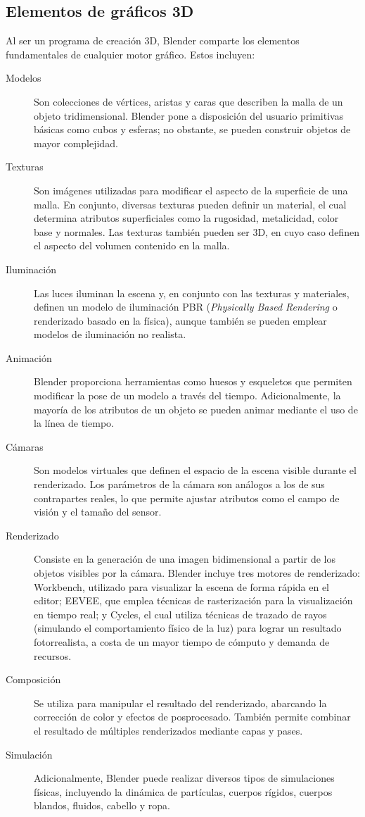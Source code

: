 \subsection{Elementos de gráficos 3D}
Al ser un programa de creación 3D, Blender comparte los elementos fundamentales de cualquier motor gráfico.
Estos incluyen:
\begin{description}
    \item[Modelos] Son colecciones de vértices, aristas y caras que describen la malla de un
    objeto tridimensional. Blender pone a disposición del usuario primitivas básicas como
    cubos y esferas; no obstante, se pueden construir objetos de mayor complejidad.
    \item[Texturas] Son imágenes utilizadas para modificar el aspecto de la superficie de
    una malla. En conjunto, diversas texturas pueden definir un material, el cual determina atributos
    superficiales como la rugosidad, metalicidad, color base y normales. Las texturas también pueden ser
    3D, en cuyo caso definen el aspecto del volumen contenido en la malla.
    \item[Iluminación] Las luces iluminan la escena y, en conjunto con las texturas y materiales,
    definen un modelo de iluminación PBR (\textit{Physically Based Rendering} o renderizado basado en la física), 
    aunque también se pueden emplear modelos de iluminación no realista.
    \item[Animación] Blender proporciona herramientas como huesos y esqueletos que permiten modificar la pose de un modelo a través
    del tiempo. Adicionalmente, la mayoría de los atributos de un objeto se pueden animar mediante el uso de la línea de tiempo.
    \item[Cámaras] Son modelos virtuales que definen el espacio de la escena visible durante
    el renderizado. Los parámetros de la cámara son análogos a los de sus contrapartes reales, lo que permite
    ajustar atributos como el campo de visión y el tamaño del sensor.
    \item[Renderizado] Consiste en la generación de una imagen bidimensional a partir de los objetos visibles por la cámara. Blender
    incluye tres motores de renderizado: Workbench, utilizado para visualizar la escena de forma rápida en el editor; 
    EEVEE, que emplea técnicas de rasterización para la visualización en tiempo real; y Cycles, el cual utiliza técnicas de 
    trazado de rayos (simulando el comportamiento físico de la luz) para lograr un resultado fotorrealista, a costa de un mayor 
    tiempo de cómputo y demanda de recursos.
    \item[Composición] Se utiliza para manipular el resultado del renderizado, abarcando la corrección de color
    y efectos de posprocesado. También permite combinar el resultado de múltiples renderizados mediante capas y pases.
    \item[Simulación] Adicionalmente, Blender puede realizar diversos tipos de simulaciones físicas, incluyendo la 
    dinámica de partículas, cuerpos rígidos, cuerpos blandos, fluidos, cabello y ropa.
\end{description}

